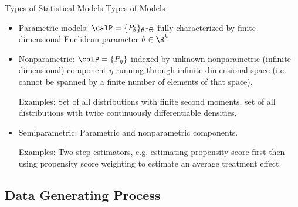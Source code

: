 \documentclass[aspectratio=169, handout]{beamer}
\begin{document}
{\footnotesize
\begin{frame}{Types of Statistical Models}
Types of Models
\begin{itemize}
  \item \alert{Parametric} models:
    $\calP=\{P_{\theta}\}_{\theta\in\Theta}$ fully characterized by
    finite-dimensional Euclidean parameter $\theta\in\R^k$

  \pause
  \item \alert{Nonparametric}:
    $\calP=\{P_\eta\}$ indexed by unknown
    nonparametric (infinite-dimensional) component $\eta$
    running through infinite-dimensional space (i.e. cannot be
    spanned by a finite number of elements of that space).

    \pause
    \alert{Examples}: Set of all distributions with finite second
    moments, set of all distributions with twice continuously
    differentiable densities.

  \pause
  \item \alert{Semiparametric}:
    Parametric and nonparametric components.

    \pause
    \alert{Examples}:
    Two step estimators, e.g. estimating propensity score first then
    using propensity score weighting to estimate an average
    treatment effect.
\end{itemize}
\end{frame}
}



\subsection{Data Generating Process}
\end{document}
